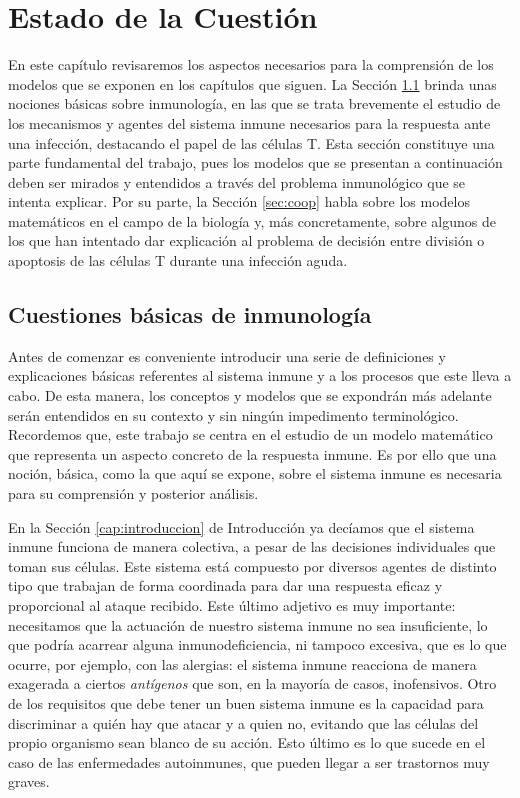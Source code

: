 \chapter{Estado de la Cuestión}
\label{cap:estadoDeLaCuestion}


En este capítulo revisaremos los aspectos necesarios para la comprensión de los modelos que se exponen en los capítulos que siguen. La Sección \ref{sec:cuestInmuno} brinda unas nociones básicas sobre inmunología, en las que se trata brevemente el estudio de los mecanismos y agentes del sistema inmune necesarios para la respuesta ante una infección, destacando el papel de las células T. Esta sección constituye una parte fundamental del trabajo, pues los modelos que se presentan a continuación deben ser mirados y entendidos a través del problema inmunológico que se intenta explicar. Por su parte, la Sección \ref{sec:coop} habla sobre los modelos matemáticos en el campo de la biología y, más concretamente, sobre algunos de los que han intentado dar explicación al problema de decisión entre división o apoptosis de las células T durante una infección aguda. 


\section{Cuestiones básicas de inmunología}
\label{sec:cuestInmuno}

Antes de comenzar es conveniente introducir una serie de definiciones y explicaciones básicas referentes al sistema inmune y a los procesos que este lleva a cabo. De esta manera, los conceptos y modelos que se expondrán más adelante serán entendidos en su contexto y sin ningún impedimento terminológico. Recordemos que, este trabajo se centra en el estudio de un modelo matemático que representa un aspecto concreto de la respuesta inmune. Es por ello que una noción, básica, como la que aquí se expone, sobre el sistema inmune es necesaria para su comprensión y posterior análisis.

En la Sección \ref{cap:introduccion} de Introducción ya decíamos que el sistema inmune funciona de manera colectiva, a pesar de las decisiones individuales que toman sus células. Este sistema está compuesto por diversos agentes de distinto tipo que trabajan de forma coordinada para dar una respuesta eficaz y proporcional al ataque recibido. Este último adjetivo es muy importante: necesitamos que la actuación de nuestro sistema inmune no sea insuficiente, lo que podría acarrear alguna inmunodeficiencia, ni tampoco excesiva, que es lo que ocurre, por ejemplo, con las alergias: el sistema inmune reacciona de manera exagerada a ciertos \textit{antígenos} que son, en la mayoría de casos, inofensivos. Otro de los requisitos que debe tener un buen sistema inmune es la capacidad para discriminar a quién hay que atacar y a quien no, evitando que las células del propio organismo sean blanco de su acción. Esto último es lo que sucede en el caso de las enfermedades autoinmunes, que pueden llegar a ser trastornos muy graves.


